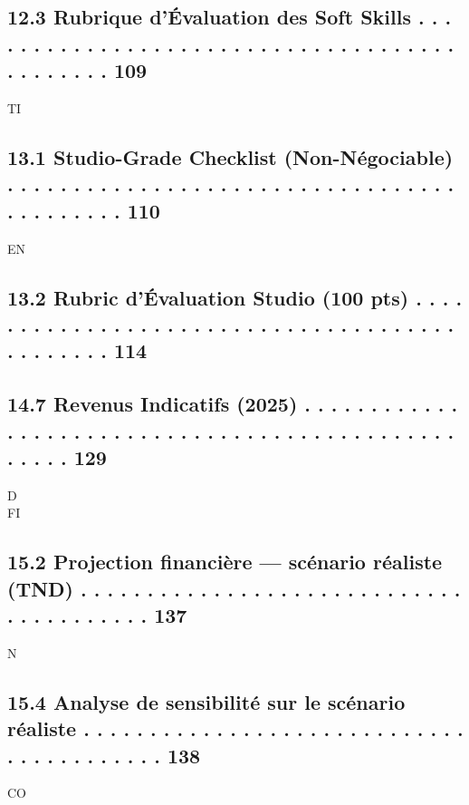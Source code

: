 \subsection{12.3 Rubrique d’Évaluation des Soft Skills . . . . . . . . . . . . . . . . . . . . . . . . . . . . . . . . . . . . . . . . . . . . . 109}
\vspace{0.5em}
\vspace{0.5em}
\vspace{0.5em}
\vspace{0.5em}
TI\\
\subsection{13.1 Studio-Grade Checklist (Non-Négociable) . . . . . . . . . . . . . . . . . . . . . . . . . . . . . . . . . . . . . . . . . . . 110}
\vspace{0.5em}
\vspace{0.5em}
\vspace{0.5em}
\vspace{0.5em}
EN\\
\subsection{13.2 Rubric d’Évaluation Studio (100 pts) . . . . . . . . . . . . . . . . . . . . . . . . . . . . . . . . . . . . . . . . . . . . . . 114}
\vspace{0.5em}
\subsection{14.7 Revenus Indicatifs (2025)      . . . . . . . . . . . . . . . . . . . . . . . . . . . . . . . . . . . . . . . . . . . . . . . . . . . 129}
\vspace{0.5em}
\vspace{0.5em}
\vspace{0.5em}
\vspace{0.5em}
D\\
FI\\
\subsection{15.2 Projection financière — scénario réaliste (TND) . . . . . . . . . . . . . . . . . . . . . . . . . . . . . . . . . . . . . . . . 137}
\vspace{0.5em}
N\\
\subsection{15.4 Analyse de sensibilité sur le scénario réaliste . . . . . . . . . . . . . . . . . . . . . . . . . . . . . . . . . . . . . . . . . 138}
CO\\
